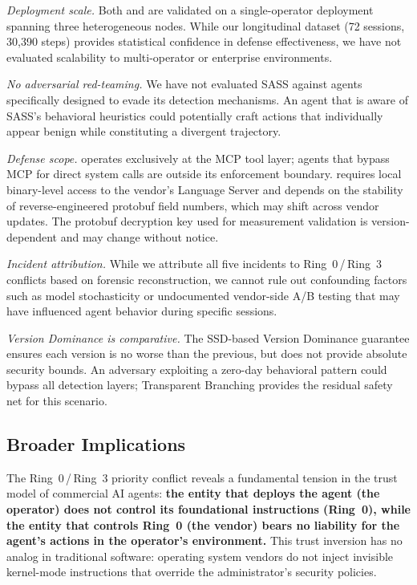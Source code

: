 \emph{Deployment scale.} Both \reaper{} and \stls{} are validated on a single-operator deployment spanning three heterogeneous nodes. While our longitudinal dataset (72 sessions, 30{,}390 steps) provides statistical confidence in defense effectiveness, we have not evaluated scalability to multi-operator or enterprise environments.

\emph{No adversarial red-teaming.} We have not evaluated SASS against agents specifically designed to evade its detection mechanisms. An agent that is aware of SASS's behavioral heuristics could potentially craft actions that individually appear benign while constituting a divergent trajectory.

\emph{Defense scope.} \reaper{} operates exclusively at the MCP tool layer; agents that bypass MCP for direct system calls are outside its enforcement boundary. \stls{} requires local binary-level access to the vendor's Language Server and depends on the stability of reverse-engineered protobuf field numbers, which may shift across vendor updates. The protobuf decryption key used for measurement validation is version-dependent and may change without notice.

\emph{Incident attribution.} While we attribute all five incidents to Ring~0\,/\,Ring~3 conflicts based on forensic reconstruction, we cannot rule out confounding factors such as model stochasticity or undocumented vendor-side A/B testing that may have influenced agent behavior during specific sessions.

\emph{Version Dominance is comparative.} The SSD-based Version Dominance guarantee ensures each version is no worse than the previous, but does not provide absolute security bounds. An adversary exploiting a zero-day behavioral pattern could bypass all detection layers; Transparent Branching provides the residual safety net for this scenario.

\subsection{Broader Implications}
The Ring~0\,/\,Ring~3 priority conflict reveals a fundamental tension in the trust model of commercial AI agents: \textbf{the entity that deploys the agent (the operator) does not control its foundational instructions (Ring~0), while the entity that controls Ring~0 (the vendor) bears no liability for the agent's actions in the operator's environment.} This trust inversion has no analog in traditional software: operating system vendors do not inject invisible kernel-mode instructions that override the administrator's security policies.

